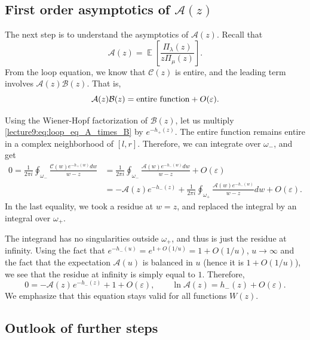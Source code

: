 \documentclass[letterpaper,11pt,oneside,reqno]{book}
\numberwithin{equation}{chapter}  %
\newcommand{\ssp}{\hspace{1pt}}
\theoremstyle{definition}
\begin{document}
\subsection{First order asymptotics of \texorpdfstring{$\mathcal{A}(z)$}{A(z)}}

The next step is to understand the asymptotics of $\mathcal{A}(z)$. Recall that
\begin{equation}
	\label{lecture9:eq:A_definition}
	\mathcal{A}(z)=\operatorname{\mathbb{E}}\left[ \frac{\Pi_\lambda(z)}{z\Pi_\mu(z)} \right].
\end{equation}
From the loop equation, we know that $\mathcal{C}(z)$ is entire, and the leading term involves $\mathcal{A}(z)\mathcal{B}(z)$. That is,
\begin{equation}
	\label{lecture9:eq:loop_eq_A_times_B}
	\mathcal{A}(z)\mathcal{B}(z) = \textnormal{entire function} + O(\varepsilon).
\end{equation}

Using the Wiener-Hopf factorization of $\mathcal{B}(z)$, let
us multiply \eqref{lecture9:eq:loop_eq_A_times_B}
by $e^{-h_+(z)}$. The entire function remains entire in a complex
neighborhood of $[l,r]$. Therefore, we can integrate over $\omega_-$, and get
\begin{align*}
	0=
	\frac{1}{2\pi i}\oint_{\omega_-}\frac{\mathcal{C}(w)e^{-h_+(w)}dw}{w-z}
	&=
	\frac{1}{2\pi i}\oint_{\omega_-}\frac{\mathcal{A}(w)e^{-h_-(w)}dw}{w-z}+O(\varepsilon)
	\\&=
	-\mathcal{A}(z)e^{-h_-(z)}+\frac{1}{2\pi i}\oint_{\omega_+}
	\frac{\mathcal{A}(w)e^{-h_-(w)}}{w-z}dw+O(\varepsilon).
\end{align*}
In the last equality, we took a residue at $w=z$, and replaced the integral
by an integral over $\omega_+$.

The integrand has no singularities outside $\omega_+$, and thus is just the residue at
infinity.
Using the fact that
$e^{-h_-(u)}=e^{1+O(1/u)}=1+O(1/u)$, $u\to\infty$
and the fact that the expectation $\mathcal{A}(u)$ is balanced in $u$
(hence it is $1+O(1/u)$),
we see that
the residue at infinity is simply equal to $1$.
Therefore,
\begin{equation*}
	0=-\mathcal{A}(z)\ssp e^{-h_-(z)}+1+O(\varepsilon),\qquad
	\ln \mathcal{A}(z)=h_-(z)+O(\varepsilon).
\end{equation*}
We emphasize that this equation stays valid for all functions $W(z)$.

\subsection{Outlook of further steps}
\end{document}
